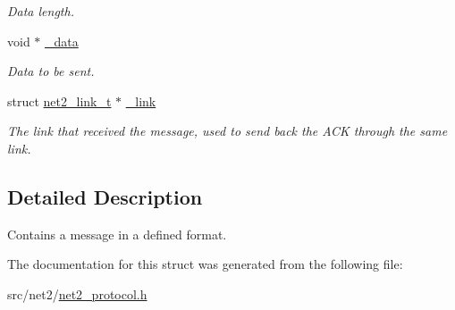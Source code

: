 \begin{DoxyCompactItemize}
\begin{DoxyCompactList}\small\item\em Data length. \end{DoxyCompactList}\item 
\hypertarget{structnet2__message__t_a157cea10e17c189684e71e2f4c30b217}{void $\ast$ \hyperlink{structnet2__message__t_a157cea10e17c189684e71e2f4c30b217}{\-\_\-data}}\label{structnet2__message__t_a157cea10e17c189684e71e2f4c30b217}

\begin{DoxyCompactList}\small\item\em Data to be sent. \end{DoxyCompactList}\item 
\hypertarget{structnet2__message__t_ad3c6032953e3934d4e833daae04051ae}{struct \hyperlink{structnet2__link__t}{net2\-\_\-link\-\_\-t} $\ast$ \hyperlink{structnet2__message__t_ad3c6032953e3934d4e833daae04051ae}{\-\_\-link}}\label{structnet2__message__t_ad3c6032953e3934d4e833daae04051ae}

\begin{DoxyCompactList}\small\item\em The link that received the message, used to send back the A\-C\-K through the same link. \end{DoxyCompactList}\end{DoxyCompactItemize}


\subsection{Detailed Description}
Contains a message in a defined format. 

The documentation for this struct was generated from the following file\-:\begin{DoxyCompactItemize}
\item 
src/net2/\hyperlink{net2__protocol_8h}{net2\-\_\-protocol.\-h}\end{DoxyCompactItemize}
